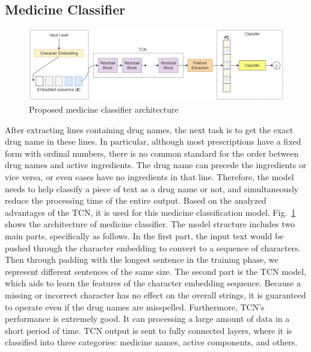 \subsection{Medicine Classifier}
\begin{figure}
\includegraphics[width=\textwidth]{method/classifer_0.png}
\caption{Proposed medicine classifier architecture} \label{fig_class_0}
\end{figure}
After extracting lines containing drug names, the next task is to get the exact drug name in these lines. In particular, although most prescriptions have a fixed form with ordinal numbers, there is no common standard for the order between drug names and active ingredients. The drug name can precede the ingredients or vice versa, or even cases have no ingredients in that line. Therefore, the model needs to help classify a piece of text as a drug name or not, and simultaneously reduce the processing time of the entire output. %
Based on the analyzed advantages of the TCN, it is used for this medicine classification model. Fig.~\ref{fig_class_0} shows the architecture of medicine classifier. 
The model structure includes two main parts, specifically as follows. In the first part, the input text would be pushed through the character embedding to convert to a sequence of characters. Then through padding with the longest sentence in the training phase, we represent different sentences of the same size. %
The second part is the TCN model, which aids to learn the features of the character embedding sequence. Because a missing or incorrect character has no effect on the overall strings, it is guaranteed to operate even if the drug names are misspelled. Furthermore, TCN's performance is extremely good. It can processing a large amount of data in a short period of time. TCN output is sent to fully connected layers, where it is classified into three categories: medicine names, active components, and others. 
